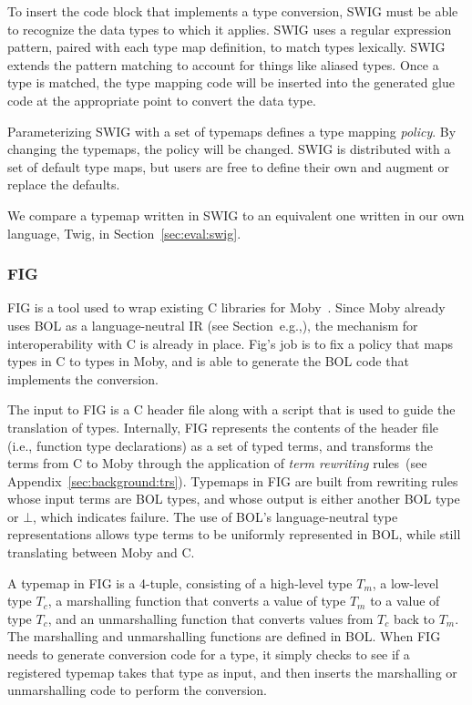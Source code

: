 To insert the code block that implements a type conversion, SWIG must be able to recognize the data types to which it applies. SWIG uses a regular expression pattern, paired with each type map definition, to match types lexically. SWIG extends the pattern matching to account for things like aliased types. Once a type is matched, the type mapping code will be inserted into the generated glue code at the appropriate point to convert the data type.

Parameterizing SWIG with a set of typemaps defines a type mapping \emph{policy}. By changing the typemaps, the policy will be changed. SWIG is distributed with a set of default type maps, but users are free to define their own and augment or replace the defaults.

We compare a typemap written in SWIG to an equivalent one written
in our own language, Twig, in Section~\ref{sec:eval:swig}.


\subsubsection{FIG}

FIG is a tool used to wrap existing C libraries for
Moby~\cite{reppy06ffi}. Since Moby already uses BOL as a
language-neutral IR (see Section~e.g.,), the mechanism for
interoperability with C is already in place. Fig's job is to fix a
policy that maps types in C to types in Moby, and is able to
generate the BOL code that implements the conversion.

The input to FIG is a C header file along with a script that is
used to guide the translation of types. Internally, FIG represents
the contents of the header file (i.e., function type declarations)
as a set of typed terms, and transforms the terms from C to Moby
through the application of \emph{term rewriting} rules~(see
Appendix~\ref{sec:background:trs}). Typemaps in FIG are built from
rewriting rules whose input terms are BOL types, and whose output
is either another BOL type or $\bot$, which indicates failure. The
use of BOL's language-neutral type representations allows type
terms to be uniformly represented in BOL, while still translating
between Moby and C.

A typemap in FIG is a 4-tuple, consisting of a high-level type
$T_m$, a low-level type $T_c$, a marshalling function that
converts a value of type $T_m$ to a value of type $T_c$, and an
unmarshalling function that converts values from $T_c$ back to
$T_m$. The marshalling and unmarshalling functions are defined in
BOL. When FIG needs to generate conversion code for a type, it
simply checks to see if a registered typemap takes that type as
input, and then inserts the marshalling or unmarshalling code to
perform the conversion.

